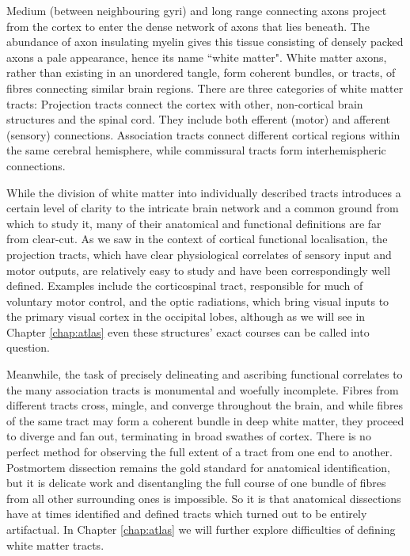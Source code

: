 Medium (between neighbouring gyri) and long range connecting axons project from the cortex to enter the dense network of axons that lies beneath.
The abundance of axon insulating myelin gives this tissue consisting of densely packed axons a pale appearance, hence its name ``white matter".
White matter axons, rather than existing in an unordered tangle, form coherent bundles, or tracts, of fibres connecting similar brain regions.
There are three categories of white matter tracts:
Projection tracts connect the cortex with other, non-cortical brain structures and the spinal cord.
They include both efferent (motor) and afferent (sensory) connections.
Association tracts connect different cortical regions within the same cerebral hemisphere, while commissural tracts form interhemispheric connections.

While the division of white matter into individually described tracts introduces a certain level of clarity to the intricate brain network and a common ground from which to study it, many of their anatomical and functional definitions are far from clear-cut.
As we saw in the context of cortical functional localisation, the projection tracts, which have clear physiological correlates of sensory input and motor outputs, are relatively easy to study and have been correspondingly well defined.
Examples include the corticospinal tract, responsible for much of voluntary motor control, and the optic radiations, which bring visual inputs to the primary visual cortex in the occipital lobes, although as we will see in Chapter \ref{chap:atlas} even these structures' exact courses can be called into question.

Meanwhile, the task of precisely delineating and ascribing functional correlates to the many association tracts is monumental and woefully incomplete.
Fibres from different tracts cross, mingle, and converge throughout the brain, and while fibres of the same tract may form a coherent bundle in deep white matter, they proceed to diverge and fan out, terminating in broad swathes of cortex.
There is no perfect method for observing the full extent of a tract from one end to another.
Postmortem dissection remains the gold standard for anatomical identification, but it is delicate work and disentangling the full course of one bundle of fibres from all other surrounding ones is impossible.
So it is that anatomical dissections have at times identified and defined tracts which turned out to be entirely artifactual.
In Chapter \ref{chap:atlas} we will further explore difficulties of defining white matter tracts.

